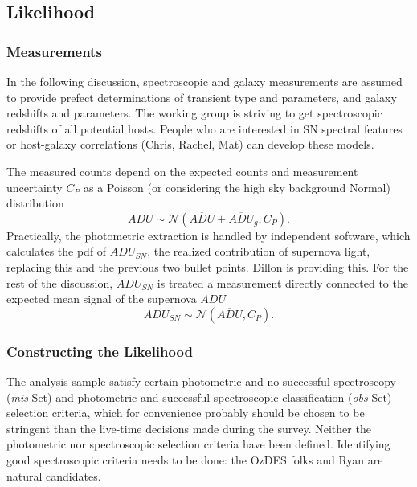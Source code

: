 \documentclass[preprint,3p]{elsarticle}
\begin{document}
\subsection{Likelihood}

\subsubsection{Measurements}
In the following discussion,
spectroscopic and galaxy measurements are assumed
to provide prefect determinations of transient type and parameters, and
galaxy redshifts and parameters.  The working group is striving to get spectroscopic
redshifts of all potential hosts.  People who are interested in SN spectral features
or host-galaxy correlations (Chris, Rachel, Mat) can develop these models.

The measured counts depend on the expected counts and measurement uncertainty
$C_P$ as a Poisson (or considering the high sky background Normal) distribution
\begin{equation}
\mathit{ADU} \sim \mathcal{N} (\overline{\mathit{ADU}}+\overline{\mathit{ADU}}_g ,C_P).
\label{ADU:eqn}
\end{equation}
Practically, the photometric extraction is handled by independent software, which calculates
the pdf of $\mathit{ADU}_{\mathit{SN}}$, the realized contribution of supernova light,
replacing this and the previous two bullet points.  Dillon is providing this.
For the rest of the discussion, $\mathit{ADU}_{\mathit{SN}}$ is treated a measurement
directly connected to the expected mean signal of the supernova
$\overline{\mathit{ADU}}$
\begin{equation}
\mathit{ADU}_{SN} \sim \mathcal{N} (\overline{\mathit{ADU}} ,C_P).
\end{equation}

\subsubsection{Constructing the Likelihood}

The analysis sample satisfy certain photometric and no successful spectroscopy
({\it mis} Set)  and photometric
and successful spectroscopic classification ({\it obs} Set) selection criteria, which for convenience
probably should  be chosen to be stringent than the live-time decisions made during the survey.
Neither the photometric nor spectroscopic selection criteria have been defined.
Identifying good spectroscopic criteria needs to be done: the OzDES folks and Ryan are natural
candidates.
\end{document}
